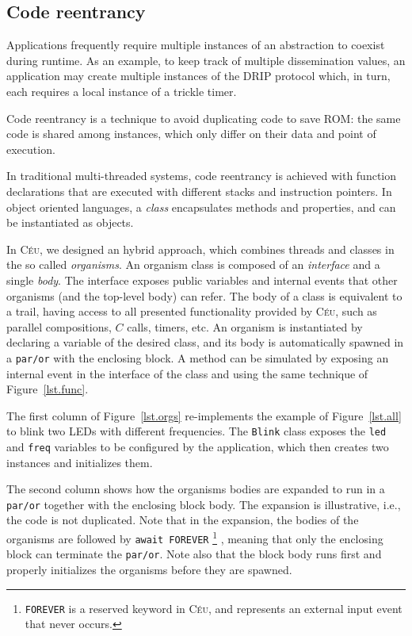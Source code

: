 \documentclass[10pt]{sensys-proc}
\newcommand{\CEU}{\textsc{C\'{e}u}\xspace}
\newcommand{\code}[1] {{\small{\texttt{#1}}}}
\begin{document}
\subsection{Code reentrancy}
\label{sec.ceu.oo}

Applications frequently require multiple instances of an abstraction to coexist 
during runtime.
As an example, to keep track of multiple dissemination values, an application 
may create multiple instances of the DRIP protocol which, in turn, each 
requires a local instance of a trickle timer.

Code reentrancy is a technique to avoid duplicating code to save ROM:
the same code is shared among instances, which only differ on their data and
point of execution.

In traditional multi-threaded systems, code reentrancy is achieved with 
function declarations that are executed with different stacks and instruction 
pointers.
In object oriented languages, a \emph{class} encapsulates methods and 
properties, and can be instantiated as objects.

In \CEU, we designed an hybrid approach, which combines threads and classes in 
the so called \emph{organisms}.
An organism class is composed of an \emph{interface} and a single \emph{body}.
The interface exposes public variables and internal events that other organisms 
(and the top-level body) can refer.
The body of a class is equivalent to a trail, having access to all presented 
functionality provided by \CEU, such as parallel compositions, $C$ calls, 
timers, etc.
An organism is instantiated by declaring a variable of the desired class, and 
its body is automatically spawned in a \code{par/or} with the enclosing block.
A method can be simulated by exposing an internal event in the interface of the 
class and using the same technique of Figure~\ref{lst.func}.

The first column of Figure~\ref{lst.orgs} re-implements the example of 
Figure~\ref{lst.all} to blink two LEDs with different frequencies.
The \code{Blink} class exposes the \code{led} and \code{freq} variables to be 
configured by the application, which then creates two instances and initializes 
them.

The second column shows how the organisms bodies are expanded to run in a 
\code{par/or} together with the enclosing block body.
The expansion is illustrative, i.e., the code is not duplicated.
Note that in the expansion, the bodies of the organisms are followed by 
\code{await~FOREVER}%
\footnote{\code{FOREVER} is a reserved keyword in \CEU, and represents an 
external input event that never occurs.}%
, meaning that only the enclosing block can terminate the \code{par/or}.
Note also that the block body runs first and properly initializes the organisms 
before they are spawned.
\end{document}
